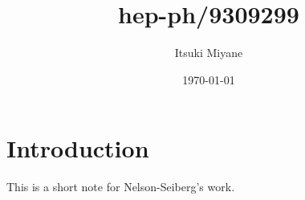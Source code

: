 \documentclass[a4paper,pdftex,10pt]{article}
\begin{document}
\title{
  hep-ph/9309299
}
\author{
  Itsuki Miyane
}
\date{\today}

\maketitle
\tableofcontents

\section{Introduction}

This is a short note for Nelson-Seiberg's work\cite{Nelson:1993nf}. 








\clearpage



\nocite{Nelson:1993nf}
\end{document}
